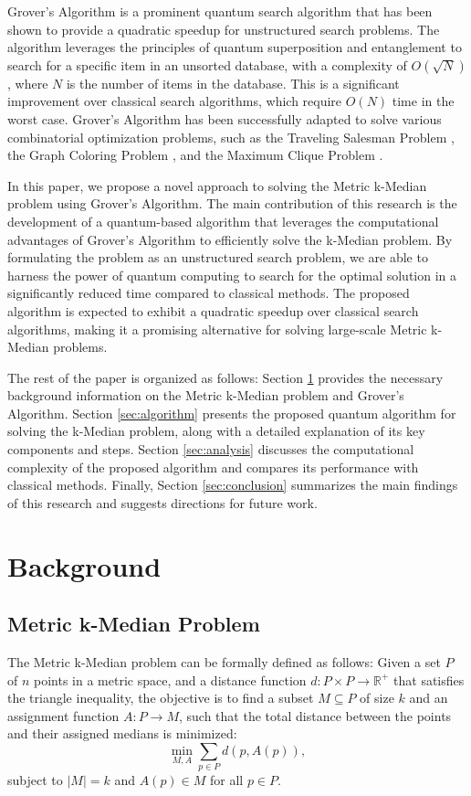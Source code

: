 Grover's Algorithm \cite{grover1996fast} is a prominent quantum search algorithm that has been shown to provide a quadratic speedup for unstructured search problems. The algorithm leverages the principles of quantum superposition and entanglement to search for a specific item in an unsorted database, with a complexity of $O(\sqrt{N})$, where $N$ is the number of items in the database. This is a significant improvement over classical search algorithms, which require $O(N)$ time in the worst case. Grover's Algorithm has been successfully adapted to solve various combinatorial optimization problems, such as the Traveling Salesman Problem \cite{zhang2005quantum}, the Graph Coloring Problem \cite{childs2000quantum}, and the Maximum Clique Problem \cite{garey1979computers}.

In this paper, we propose a novel approach to solving the Metric k-Median problem using Grover's Algorithm. The main contribution of this research is the development of a quantum-based algorithm that leverages the computational advantages of Grover's Algorithm to efficiently solve the k-Median problem. By formulating the problem as an unstructured search problem, we are able to harness the power of quantum computing to search for the optimal solution in a significantly reduced time compared to classical methods. The proposed algorithm is expected to exhibit a quadratic speedup over classical search algorithms, making it a promising alternative for solving large-scale Metric k-Median problems.

The rest of the paper is organized as follows: Section \ref{sec:background} provides the necessary background information on the Metric k-Median problem and Grover's Algorithm. Section \ref{sec:algorithm} presents the proposed quantum algorithm for solving the k-Median problem, along with a detailed explanation of its key components and steps. Section \ref{sec:analysis} discusses the computational complexity of the proposed algorithm and compares its performance with classical methods. Finally, Section \ref{sec:conclusion} summarizes the main findings of this research and suggests directions for future work.

\section{Background} \label{sec:background}

\subsection{Metric k-Median Problem}
The Metric k-Median problem can be formally defined as follows: Given a set $P$ of $n$ points in a metric space, and a distance function $d: P \times P \rightarrow \mathbb{R}^+$ that satisfies the triangle inequality, the objective is to find a subset $M \subseteq P$ of size $k$ and an assignment function $A: P \rightarrow M$, such that the total distance between the points and their assigned medians is minimized:
\begin{equation}
\min_{M, A} \sum_{p \in P} d(p, A(p)),
\end{equation}
subject to $|M| = k$ and $A(p) \in M$ for all $p \in P$.

